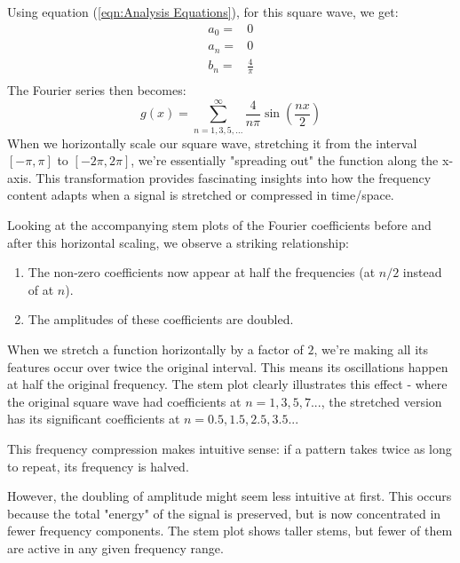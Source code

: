 \documentclass{article}
\begin{document}
Using equation (\ref{eqn:Analysis Equations}), for this square wave, we get:
    \begin{eqnarray}
    a_0 =& 0\nonumber\\
    a_n =& 0\\
    b_n =& \frac{4}{\pi}\nonumber\\
    \end{eqnarray}
The Fourier series then becomes:
\begin{equation}
g(x) = \sum_{n=1,3,5,...}^{\infty} \frac{4}{n\pi} \sin\left(\frac{nx}{2}\right)
\end{equation}
When we horizontally scale our square wave, stretching it from the interval $[-\pi, \pi]$ to $[-2\pi, 2\pi]$, we're essentially "spreading out" the function along the x-axis. This transformation provides fascinating insights into how the frequency content adapts when a signal is stretched or compressed in time/space.
\vspace{0.2in}

Looking at the accompanying stem plots of the Fourier coefficients before and after this horizontal scaling, we observe a striking relationship:\\
\begin{enumerate}
\item The non-zero coefficients now appear at half the frequencies (at $n/2$ instead of at $n$).
\item The amplitudes of these coefficients are doubled.
\end{enumerate}
When we stretch a function horizontally by a factor of $2$, we're making all its features occur over twice the original interval. This means its oscillations happen at half the original frequency. The stem plot clearly illustrates this effect - where the original square wave had coefficients at $n = 1, 3, 5, 7...$, the stretched version has its significant coefficients at $n = 0.5, 1.5, 2.5, 3.5...$
\vspace{0.2in}

This frequency compression makes intuitive sense: if a pattern takes twice as long to repeat, its frequency is halved.
\vspace{0.2in}

However, the doubling of amplitude might seem less intuitive at first. This occurs because the total "energy" of the signal is preserved, but is now concentrated in fewer frequency components. The stem plot shows taller stems, but fewer of them are active in any given frequency range.
\vspace{0.2in}
\end{document}
